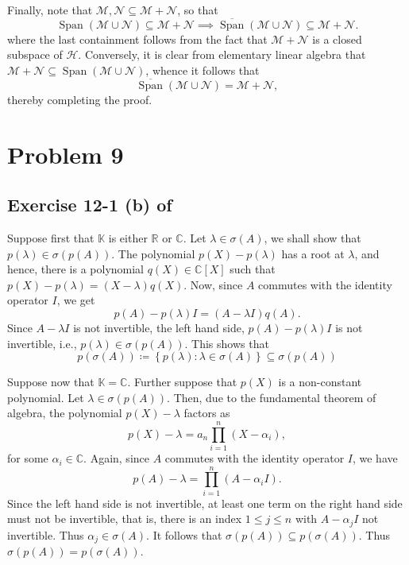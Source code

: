 \documentclass[10pt]{amsart}
\theoremstyle{thmstyle}
\theoremstyle{defstyle}
\newcommand{\R}{\mathbb{R}}
\newcommand{\bbC}{\mathbb{C}}
\newcommand{\K}{\mathbb{K}}
\newcommand{\calH}{\mathcal{H}} %
\newcommand{\calM}{\mathcal{M}}
\newcommand{\calN}{\mathcal{N}}
\newcommand{\Span}{\operatorname{Span}}
\renewcommand{\le}{\leqslant}
\begin{document}
Finally, note that $\calM,\calN\subseteq\calM + \calN$, so that 
\begin{equation*}
    \Span\left(\calM\cup\calN\right)\subseteq\calM + \calN\implies\overline{\Span}\left(\calM\cup\calN\right)\subseteq\calM + \calN.
\end{equation*}
where the last containment follows from the fact that $\calM + \calN$ is a closed subspace of $\calH$. Conversely, it is clear from elementary linear algebra that $\calM + \calN\subseteq\Span\left(\calM\cup\calN\right)$, whence it follows that 
\begin{equation*}
    \overline{\Span}\left(\calM\cup\calN\right) = \calM + \calN,
\end{equation*}
thereby completing the proof.

\section{Problem 9}

\subsection*{Exercise 12-1 (b) of \texorpdfstring{\cite{limaye-functional}}{[Lim14]}}

Suppose first that $\K$ is either $\R$ or $\bbC$. Let $\lambda\in\sigma(A)$, we shall show that $p(\lambda)\in\sigma\left(p(A)\right)$. The polynomial $p(X) - p(\lambda)$ has a root at $\lambda$, and hence, there is a polynomial $q(X)\in\bbC[X]$ such that $p(X) - p(\lambda) = (X - \lambda)q(X)$. Now, since $A$ commutes with the identity operator $I$, we get \begin{equation*}
    p(A) - p(\lambda)I = (A - \lambda I)q(A).
\end{equation*}
Since $A - \lambda I$ is not invertible, the left hand side, $p(A) - p(\lambda)I$ is not invertible, i.e., $p(\lambda)\in\sigma\left(p(A)\right)$. This shows that 
\begin{equation*}
    p\left(\sigma(A)\right)\coloneq\left\{p(\lambda)\colon\lambda\in\sigma(A)\right\}\subseteq \sigma\left(p(A)\right)
\end{equation*}

Suppose now that $\K = \bbC$. Further suppose that $p(X)$ is a non-constant polynomial. Let $\lambda\in\sigma(p(A))$. Then, due to the fundamental theorem of algebra, the polynomial $p(X) - \lambda$ factors as 
\begin{equation*}
    p(X) - \lambda = a_n\prod_{i = 1}^n (X - \alpha_i),
\end{equation*}
for some $\alpha_i\in\bbC$. Again, since $A$ commutes with the identity operator $I$, we have 
\begin{equation*}
    p(A) - \lambda = \prod_{i = 1}^n (A - \alpha_i I).
\end{equation*}
Since the left hand side is not invertible, at least one term on the right hand side must not be invertible, that is, there is an index $1\le j\le n$ with $A - \alpha_j I$ not invertible. Thus $\alpha_j\in \sigma(A)$. It follows that $\sigma(p(A))\subseteq p(\sigma(A))$. Thus $\sigma(p(A)) = p(\sigma(A))$.
\end{document}
